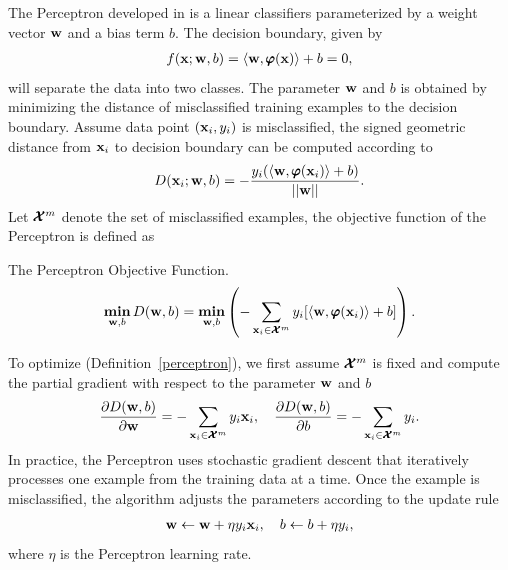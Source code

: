 {The Perceptron developed in \citep{Rosenblatt58,Rosenblatt62} is a linear classifiers parameterized by a weight vector $\mathbf {w}$ and a bias term $b$. 
The decision boundary, given by 
\begin{align*}
	f(\mathbf {x};\mathbf {w},b) = \langle \mathbf {w}, \pmb \varphi(\mathbf {x}) \rangle + b =0,
\end{align*}
will separate the data into two classes.
The parameter $\mathbf {w}$ and $b$ is obtained by minimizing the distance of misclassified training examples to the decision boundary.
Assume data point $(\mathbf {x}_i,y_i)$ is misclassified, the signed geometric distance from $\mathbf {x}_i$ to decision boundary can be computed according to
\begin{align*}
	D(\mathbf {x}_i;\mathbf {w},b) = -\frac{y_i(\langle \mathbf {w}, \pmb \varphi(\mathbf {x}_i) \rangle+b)}{\left|\left| \mathbf {w} \right|\right|}.
\end{align*}
Let $\pmb {\mathcal{X}}^m$ denote the set of misclassified examples, the objective function of the Perceptron is defined as
\begin{definition}{The Perceptron Objective Function.}\label{perceptron}
	\begin{align*}
		\underset{\mathbf {w},b}{\textbf{min}} \, D(\mathbf {w},b) = \underset{\mathbf {w},b}{\textbf{min}} \left( -\sum_{\mathbf {x}_i\in\pmb {\mathcal{X}}^{m}}y_i[\langle \mathbf {w}, \pmb \varphi(\mathbf {x}_i) \rangle+b]\right).
	\end{align*}
\end{definition}
To optimize (Definition~\ref{perceptron}), we first assume $\pmb {\mathcal{X}}^{m}$ is fixed and compute the partial gradient with respect to the parameter $\mathbf {w}$ and $b$
\begin{align*}
	\frac{\partial D(\mathbf {w},b)}{\partial\mathbf {w}} = -\sum_{\mathbf {x}_i\in\pmb {\mathcal{X}}^m}{y_i\mathbf {x}_i},\quad
	\frac{\partial D(\mathbf {w},b)}{\partial b} = -\sum_{\mathbf {x}_i\in\pmb {\mathcal{X}}^m}{y_i}.
\end{align*}
In practice, the Perceptron uses stochastic gradient descent that iteratively processes one example from the training data at a time.
Once the example is misclassified, the algorithm adjusts the parameters according to the update rule
\begin{align*}
	\mathbf {w} \leftarrow \mathbf {w} + \eta y_i \mathbf {x}_i, \quad b \leftarrow b + \eta y_i,
\end{align*}
where $\eta$ is the Perceptron learning rate.

}
